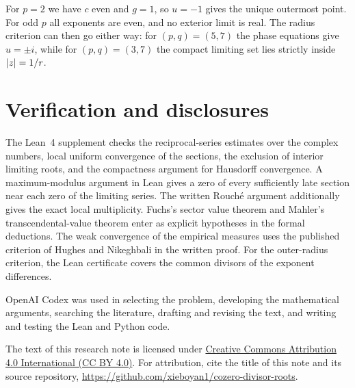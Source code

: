 \documentclass[11pt]{article}
\begin{document}
For \(p=2\) we have \(c\) even and \(g=1\), so \(u=-1\) gives the
unique outermost point. For odd \(p\) all exponents are even,
and no exterior limit is real. The radius criterion can then go either way:
for \((p,q)=(5,7)\) the phase equations give \(u=\pm i\),
while for \((p,q)=(3,7)\) the compact limiting set lies strictly
inside \(|z|=\smash{1/r}\).


\section*{Verification and disclosures}
The Lean~4 supplement checks the reciprocal-series estimates over
the complex numbers, local uniform convergence of the sections, the
exclusion of interior limiting roots, and the compactness argument
for Hausdorff convergence. A maximum-modulus argument in Lean gives
a zero of every sufficiently late section near each zero of the
limiting series. The written Rouch\'e argument additionally gives the
exact local multiplicity. Fuchs's sector value theorem and Mahler's
transcendental-value theorem enter as explicit hypotheses in the
formal deductions. The weak convergence of the empirical measures
uses the published criterion of Hughes and Nikeghbali in the written
proof. For the outer-radius criterion, the Lean certificate covers
the common divisors of the exponent differences.

OpenAI Codex was used in selecting the problem, developing the
mathematical arguments, searching the literature, drafting and
revising the text, and writing and testing the Lean and Python code.

The text of this research note is licensed under
\href{https://creativecommons.org/licenses/by/4.0/}{Creative Commons Attribution 4.0 International (CC BY 4.0)}.
For attribution, cite the title of this note and its source repository,
\url{https://github.com/xieboyan1/cozero-divisor-roots}.
\end{document}
